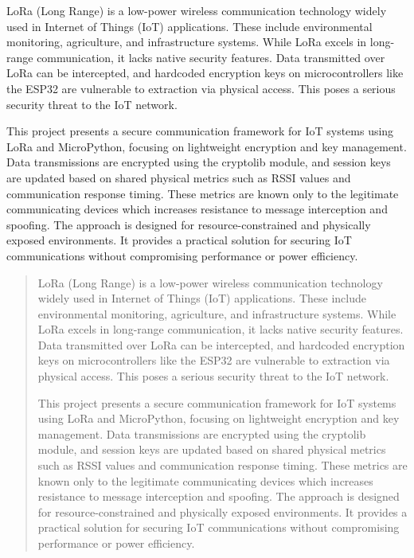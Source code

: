 \maketitle
\makesignature

\ifproject
\begin{abstractTH}
LoRa (Long Range) is a low-power wireless communication technology widely used in Internet of Things (IoT) applications. These include environmental monitoring, agriculture, and infrastructure systems. While LoRa excels in long-range communication, it lacks native security features. Data transmitted over LoRa can be intercepted, and hardcoded encryption keys on microcontrollers like the ESP32 are vulnerable to extraction via physical access. This poses a serious security threat to the IoT network. 
 
This project presents a secure communication framework for IoT systems using LoRa and MicroPython, focusing on lightweight encryption and key management. Data transmissions are encrypted using the cryptolib module, and session keys are updated based on shared physical metrics such as RSSI values and communication response timing. These metrics are known only to the legitimate communicating devices which  increases resistance to message interception and spoofing. The approach is designed for resource-constrained and physically exposed environments. It provides a practical solution for securing IoT communications without compromising performance or power efficiency.
\end{abstractTH}

\begin{abstract}
LoRa (Long Range) is a low-power wireless communication technology widely used in Internet of Things (IoT) applications. These include environmental monitoring, agriculture, and infrastructure systems. While LoRa excels in long-range communication, it lacks native security features. Data transmitted over LoRa can be intercepted, and hardcoded encryption keys on microcontrollers like the ESP32 are vulnerable to extraction via physical access. This poses a serious security threat to the IoT network. 
 
This project presents a secure communication framework for IoT systems using LoRa and MicroPython, focusing on lightweight encryption and key management. Data transmissions are encrypted using the cryptolib module, and session keys are updated based on shared physical metrics such as RSSI values and communication response timing. These metrics are known only to the legitimate communicating devices which  increases resistance to message interception and spoofing. The approach is designed for resource-constrained and physically exposed environments. It provides a practical solution for securing IoT communications without compromising performance or power efficiency.

\end{abstract}

